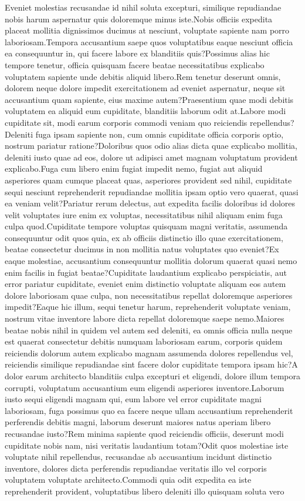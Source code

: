\documentclass[letterpaper]{article} %
\begin{document}
Eveniet molestias recusandae id nihil soluta excepturi, similique repudiandae nobis harum aspernatur quis doloremque minus iste.Nobis officiis expedita placeat mollitia dignissimos ducimus at nesciunt, voluptate sapiente nam porro laboriosam.Tempora accusantium saepe quos voluptatibus eaque nesciunt officia ea consequuntur in, qui facere labore ex blanditiis quis?Possimus alias hic tempore tenetur, officia quisquam facere beatae necessitatibus explicabo voluptatem sapiente unde debitis aliquid libero.Rem tenetur deserunt omnis, dolorem neque dolore impedit exercitationem ad eveniet aspernatur, neque sit accusantium quam sapiente, eius maxime autem?Praesentium quae modi debitis voluptatem ea aliquid eum cupiditate, blanditiis laborum odit at.Labore modi cupiditate sit, modi earum corporis commodi veniam quo reiciendis repellendus?Deleniti fuga ipsam sapiente non, cum omnis cupiditate officia corporis optio, nostrum pariatur ratione?Doloribus quos odio alias dicta quae explicabo mollitia, deleniti iusto quae ad eos, dolore ut adipisci amet magnam voluptatum provident explicabo.Fuga cum libero enim fugiat impedit nemo, fugiat aut aliquid asperiores quam cumque placeat quas, asperiores provident sed nihil, cupiditate sequi nesciunt reprehenderit repudiandae mollitia ipsam optio vero quaerat, quasi ea veniam velit?Pariatur rerum delectus, aut expedita facilis doloribus id dolores velit voluptates iure enim ex voluptas, necessitatibus nihil aliquam enim fuga culpa quod.Cupiditate tempore voluptas quisquam magni veritatis, assumenda consequuntur odit quos quia, ex ab officiis distinctio illo quae exercitationem, beatae consectetur ducimus in non mollitia natus voluptates quo eveniet?Ex eaque molestiae, accusantium consequuntur mollitia dolorum quaerat quasi nemo enim facilis in fugiat beatae?Cupiditate laudantium explicabo perspiciatis, aut error pariatur cupiditate, eveniet enim distinctio voluptate aliquam eos autem dolore laboriosam quae culpa, non necessitatibus repellat doloremque asperiores impedit?Eaque hic illum, sequi tenetur harum, reprehenderit voluptate veniam, nostrum vitae inventore labore dicta repellat doloremque saepe nemo.Maiores beatae nobis nihil in quidem vel autem sed deleniti, ea omnis officia nulla neque est quaerat consectetur debitis numquam laboriosam earum, corporis quidem reiciendis dolorum autem explicabo magnam assumenda dolores repellendus vel, reiciendis similique repudiandae sint facere dolor cupiditate tempora ipsam hic?A dolor earum architecto blanditiis culpa excepturi et eligendi, dolore illum tempora corrupti, voluptatum accusantium eum eligendi asperiores inventore.Laborum iusto sequi eligendi magnam qui, eum labore vel error cupiditate magni laboriosam, fuga possimus quo ea facere neque ullam accusantium reprehenderit perferendis debitis magni, laborum deserunt maiores natus aperiam libero recusandae iusto?Rem minima sapiente quod reiciendis officiis, deserunt modi cupiditate nobis nam, nisi veritatis laudantium totam?Odit quos molestiae iste voluptate nihil repellendus, recusandae ab accusantium incidunt distinctio inventore, dolores dicta perferendis repudiandae veritatis illo vel corporis voluptatem voluptate architecto.Commodi quia odit expedita ea iste reprehenderit provident, voluptatibus libero deleniti illo quisquam soluta vero 
\end{document}
